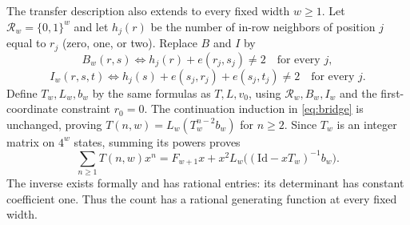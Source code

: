 \documentclass[11pt]{article}
\begin{document}
The transfer description also extends to every fixed width $w\geq1$.
Let $\mathcal R_w=\{0,1\}^w$ and let $h_j(r)$ be the number of
in-row neighbors of position $j$ equal to $r_j$ (zero, one, or two).
Replace $B$ and $I$ by
\[
 B_w(r,s)\iff h_j(r)+e(r_j,s_j)\ne2\quad\text{for every }j,
\]
\[
 I_w(r,s,t)\iff h_j(s)+e(s_j,r_j)+e(s_j,t_j)\ne2
                    \quad\text{for every }j.
\]
Define $T_w,L_w,b_w$ by the same formulas as $T,L,v_0$, using
$\mathcal R_w,B_w,I_w$ and the first-coordinate constraint $r_0=0$.
The continuation induction in \eqref{eq:bridge} is unchanged, proving
$T(n,w)=L_w(T_w^{n-2}b_w)$ for $n\geq2$. Since $T_w$ is an integer
matrix on $4^w$ states, summing its powers proves
\[
 \sum_{n\geq1}T(n,w)x^n
 =F_{w+1}x+x^2 L_w\bigl((\mathrm{Id}-xT_w)^{-1}b_w\bigr).
\]
The inverse exists formally and has rational entries: its determinant
has constant coefficient one. Thus the count has a rational generating
function at every fixed width.
\end{document}
